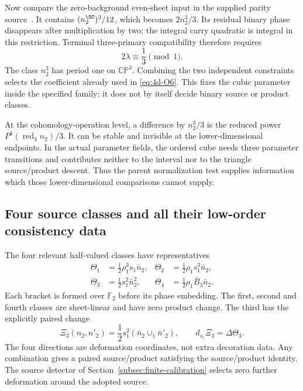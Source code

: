 Now compare the zero-background even-sheet input in the supplied parity source~\cite[Eq.~(207)]{Project4}. It contains $(n_2^{\SC})^3/12$, which becomes $2n_2^3/3$. Its residual binary phase disappears after multiplication by two; the integral carry quadratic is integral in this restriction. Terminal three-primary compatibility therefore requires
\begin{equation}\label{eq:parity-lambda}
 2\lambda\equiv\frac13\pmod1.
\end{equation}
The class $n_2^3$ has period one on $\mathbb{CP}^3$. Combining the two independent constraints selects the coefficient already used in \eqref{eq:4d-O6}. This fixes the cubic parameter inside the specified family; it does not by itself decide binary source or product classes.

At the cohomology-operation level, a difference by $n_2^3/3$ is the reduced power $P^1(\operatorname{red}_3n_2)/3$. It can be stable and invisible at the lower-dimensional endpoints. In the actual parameter fields, the ordered cube needs three parameter transitions and contributes neither to the interval nor to the triangle source/product descent. Thus the parent normalization test supplies information which those lower-dimensional comparisons cannot supply.

\subsection{Four source classes and all their low-order consistency data}
The four relevant half-valued classes have representatives
\begin{equation}\label{eq:fourtheta04}
\begin{aligned}
\Theta_1&=\frac12\rho_1^3s_1\bar n_2,
&\Theta_2&=\frac12\rho_1s_1^3\bar n_2,\\
\Theta_3&=\frac12s_1^2\bar n_2^2,
&\Theta_4&=\frac12\rho_1\bar B_3\bar n_2.
\end{aligned}
\end{equation}
Each bracket is formed over $\mathbb F_2$ before its phase embedding. The first, second and fourth classes are sheet-linear and have zero product change. The third has the explicitly paired change
\begin{equation}\label{eq:xi3_04}
 \Xi_3(n_2,n'_2)=\frac12s_1^2(\bar n_2\cup_1\bar n'_2),
 \qquad d_{s_1}\Xi_3=\Delta\Theta_3.
\end{equation}
The four directions are deformation coordinates, not extra decoration data. Any combination gives a paired source/product satisfying the source/product identity. The source detector of Section~\ref{subsec:finite-calibration} selects zero further deformation around the adopted source.

